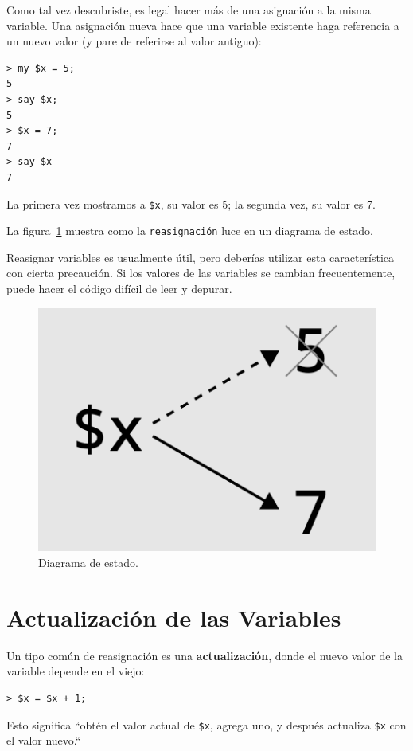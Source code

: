 Como tal vez descubriste, es legal hacer más de una asignación a la 
misma variable. Una asignación nueva hace que una variable existente
haga referencia a un nuevo valor (y pare de referirse al valor antiguo):

\begin{verbatim}
> my $x = 5;
5
> say $x;
5
> $x = 7;
7
> say $x
7
\end{verbatim}
%
La primera vez mostramos a {\tt \$x},
su valor es 5; la segunda vez, su valor es 7.

La figura~\ref{fig.assign2} muestra como la {\tt reasignación}
luce en un diagrama de estado. 
 

Reasignar variables es usualmente útil, pero deberías utilizar esta
característica con cierta precaución. Si los valores de las variables 
se cambian frecuentemente, puede hacer el código difícil de leer y depurar.

\begin{figure}
\centerline
{\includegraphics[scale=0.5]{figs/reassignment.pdf}}
\caption{Diagrama de estado.}
\label{fig.assign2}
\end{figure}



\section{Actualización de las Variables}
\label{update}


Un tipo común de reasignación es una {\bf actualización},
donde el nuevo valor de la variable depende en el viejo:

\begin{verbatim}
> $x = $x + 1;
\end{verbatim}
%
Esto significa ``obtén el valor actual de {\tt \$x}, agrega uno, y después
actualiza {\tt \$x} con el valor nuevo.``

